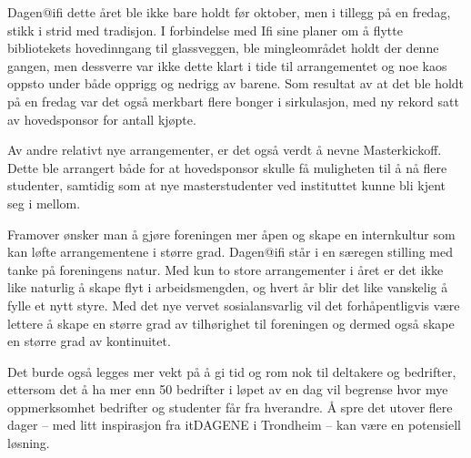Dagen@ifi dette året ble ikke bare holdt før oktober, men i tillegg på en fredag, stikk i strid med tradisjon. I forbindelse med Ifi sine planer om å flytte bibliotekets hovedinngang til glassveggen, ble mingleområdet holdt der denne gangen, men dessverre var ikke dette klart i tide til arrangementet og noe kaos oppsto under både opprigg og nedrigg av barene. Som resultat av at det ble holdt på en fredag var det også merkbart flere bonger i sirkulasjon, med ny rekord satt av hovedsponsor for antall kjøpte.

Av andre relativt nye arrangementer, er det også verdt å nevne Masterkickoff. Dette ble arrangert både for at hovedsponsor skulle få muligheten til å nå flere studenter, samtidig som at nye masterstudenter ved instituttet kunne bli kjent seg i mellom.

Framover ønsker man å gjøre foreningen mer åpen og skape en internkultur som kan løfte arrangementene i større grad. Dagen@ifi står i en særegen stilling med tanke på foreningens natur. Med kun to store arrangementer i året er det ikke like naturlig å skape flyt i arbeidsmengden, og hvert år blir det like vanskelig å fylle et nytt styre. Med det nye vervet sosialansvarlig vil det forhåpentligvis være lettere å skape en større grad av tilhørighet til foreningen og dermed også skape en større grad av kontinuitet.

Det burde også legges mer vekt på å gi tid og rom nok til deltakere og bedrifter, ettersom det å ha mer enn 50 bedrifter i løpet av en dag vil begrense hvor mye oppmerksomhet bedrifter og studenter får fra hverandre. Å spre det utover flere dager -- med litt inspirasjon fra itDAGENE i Trondheim -- kan være en potensiell løsning.